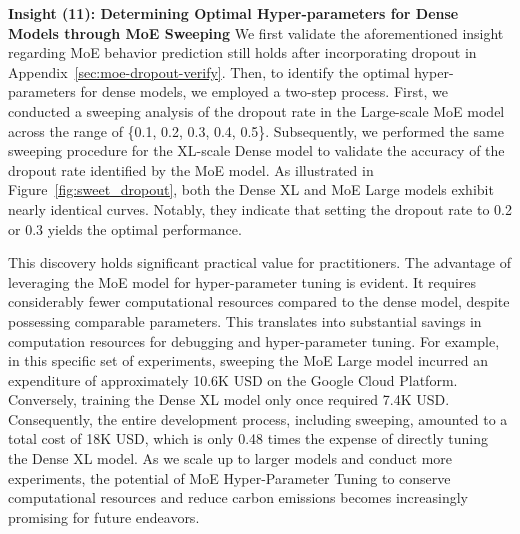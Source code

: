 \documentclass{article}
\begin{document}





\textbf{Insight (11): Determining Optimal Hyper-parameters for Dense Models through MoE Sweeping} 
We first validate the aforementioned insight regarding MoE behavior prediction still holds after incorporating dropout in Appendix~\ref{sec:moe-dropout-verify}. Then, to identify the optimal hyper-parameters for dense models, we employed a two-step process. First, we conducted a sweeping analysis of the dropout rate in the Large-scale MoE model across the range of \{0.1, 0.2, 0.3, 0.4, 0.5\}. Subsequently, we performed the same sweeping procedure for the XL-scale Dense model to validate the accuracy of the dropout rate identified by the MoE model. As illustrated in Figure~\ref{fig:sweet_dropout}, both the Dense XL and MoE Large models exhibit nearly identical curves. Notably, they indicate that setting the dropout rate to 0.2 or 0.3 yields the optimal performance. 

This discovery holds significant practical value for practitioners. The advantage of leveraging the MoE model for hyper-parameter tuning is evident. It requires considerably fewer computational resources compared to the dense model, despite possessing comparable parameters. This translates into substantial savings in computation resources for debugging and hyper-parameter tuning. For example, in this specific set of experiments, sweeping the MoE Large model incurred an expenditure of approximately 10.6K USD on the Google Cloud Platform. Conversely, training the Dense XL model only once required 7.4K USD. Consequently, the entire development process, including sweeping, amounted to a total cost of 18K USD, which is only 0.48 times the expense of directly tuning the Dense XL model. As we scale up to larger models and conduct more experiments, the potential of MoE Hyper-Parameter Tuning to conserve computational resources and reduce carbon emissions becomes increasingly promising for future endeavors.
\end{document}
